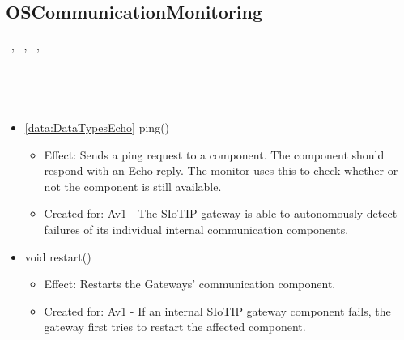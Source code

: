   \subsection{OSCommunicationMonitoring}\label{int:GatewayGatewayOnlineServiceCommunicationMonitorOSCommunicationMonitoring}
    \begin{description}
      \item[Provided by:] \iconcomponent{}~, \iconcomponent{}~, \iconcomponent{}~, \iconcomponent{}~
      \item[Required by:] \iconcomponent{}~
      \item[Operations:] ~
    \begin{itemize}[noitemsep,nolistsep,leftmargin=-.25cm]
      \item \textsf{\ref{data:DataTypesEcho} ping()}
        \begin{itemize}[noitemsep,nolistsep]
           \item Effect: Sends a ping request to a component. The component should respond with an Echo reply. The monitor uses this to check whether or not the component is still available.
\item Created for: Av1 - The SIoTIP gateway is able to autonomously detect failures of its individual internal communication components.
        \end{itemize}
      \item \textsf{void restart()}
        \begin{itemize}[noitemsep,nolistsep]
           \item Effect: Restarts the Gateways' communication component.
\item Created for: Av1 - If an internal SIoTIP gateway component fails, the gateway first tries to restart the affected component.
        \end{itemize}
    \end{itemize}
    \end{description}


